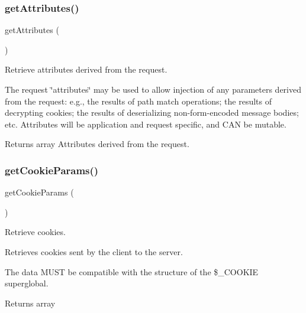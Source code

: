 \subsubsection{\texorpdfstring{get\+Attributes()}{getAttributes()}}
{\footnotesize\ttfamily get\+Attributes (\begin{DoxyParamCaption}{ }\end{DoxyParamCaption})}

Retrieve attributes derived from the request.

The request \char`\"{}attributes\char`\"{} may be used to allow injection of any parameters derived from the request\+: e.\+g., the results of path match operations; the results of decrypting cookies; the results of deserializing non-\/form-\/encoded message bodies; etc. Attributes will be application and request specific, and C\+AN be mutable.

\begin{DoxyReturn}{Returns}
array Attributes derived from the request. 
\end{DoxyReturn}
\mbox{\label{class_pes_1_1_http_1_1_request_a9ff463aec362b0a45e64656b62d939bd}} 
\subsubsection{\texorpdfstring{get\+Cookie\+Params()}{getCookieParams()}}
{\footnotesize\ttfamily get\+Cookie\+Params (\begin{DoxyParamCaption}{ }\end{DoxyParamCaption})}

Retrieve cookies.

Retrieves cookies sent by the client to the server.

The data M\+U\+ST be compatible with the structure of the \$\+\_\+\+C\+O\+O\+K\+IE superglobal.

\begin{DoxyReturn}{Returns}
array 
\end{DoxyReturn}
\mbox{\label{class_pes_1_1_http_1_1_request_af3e37e1a6ed9b8c87f86f659873a83b7}} 
